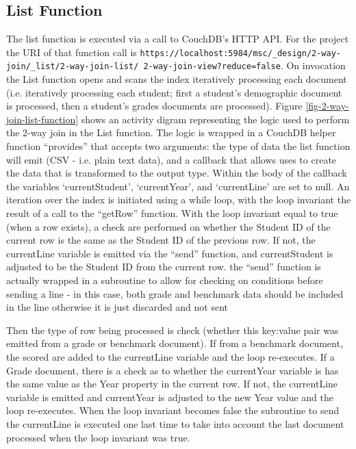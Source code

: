 \subsection{List Function}
The list function is executed via a call to CouchDB's HTTP API. For the project the URI of that function call is \texttt{https://localhost:5984/msc/\_design/2-way-join/\_list/2-way-join-list/ 2-way-join-view?reduce=false}. On invocation the List function opens and scans the index iteratively processing each document (i.e. iteratively processing each student; first a student's demographic document is processed, then a student's grades documents are processed). Figure \ref{fig-2-way-join-list-function} shows an activity digram representing the logic used to perform the 2-way join in the List function. The logic is wrapped in a CouchDB helper function ``provides'' that accepts two arguments: the type of data the list function will emit (CSV - i.e. plain text data), and a callback that allows uses to create the data that is transformed to the output type. Within the body of the callback the variables `currentStudent', `currentYear', and `currentLine' are set to null. An iteration over the index is initiated using a while loop, with the loop invariant the result of a call to the ``getRow'' function. With the loop invariant equal to true (when a row exists), a check are performed on whether the Student ID of the current row is the same as the Student ID of the previous row. If not, the currentLine variable is emitted via the ``send'' function, and currentStudent is adjusted to be the Student ID from the current row. the ``send'' function is actually wrapped in a subroutine to allow for checking on conditions before sending a line - in this case, both grade and benchmark data should be included in the line otherwise it is just discarded and not sent

Then the type of row being processed is check (whether this key:value pair was emitted from a grade or benchmark document). If from a benchmark document, the scored are added to the currentLine variable and the loop re-executes. If a Grade document, there is a check as to whether the currentYear variable is has the same value as the Year property in the current row. If not, the currentLine variable is emitted and currentYear is adjusted to the new Year value and the loop re-executes. When the loop invariant becomes false the subroutine to send the currentLine is executed one last time to take into account the last document processed when the loop invariant was true.

